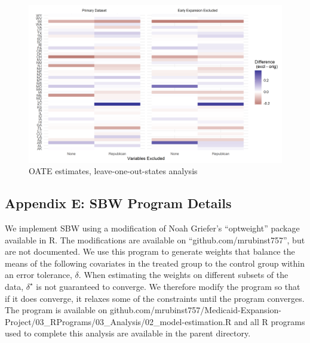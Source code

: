 \documentclass[12pt]{article}
\begin{document}
\begin{figure}[]
\begin{center}
    \includegraphics[scale=0.6]{01_Plots/oate-loo-state-cov-group-heatmap-states.png}
    \caption{OATE estimates, leave-one-out-states analysis}
    \label{fig:oateheatmap}
\end{center}
\end{figure}


\subsection{Appendix E: SBW Program Details}

We implement SBW using a modification of Noah Griefer's ``optweight'' package available in R. The modifications are available on ``github.com/mrubinst757'', but are not documented. We use this program to generate weights that balance the means of the following covariates in the treated group to the control group within an error tolerance, $\delta$. When estimating the weights on different subsets of the data, $\delta^\star$ is not guaranteed to converge. We therefore modify the program so that if it does converge, it relaxes some of the constraints until the program converges. The program is available on github.com/mrubinst757/Medicaid-Expansion-Project/03\_RPrograms/03\_Analysis/02\_model-estimation.R and all R programs used to complete this analysis are available in the parent directory.
\end{document}
